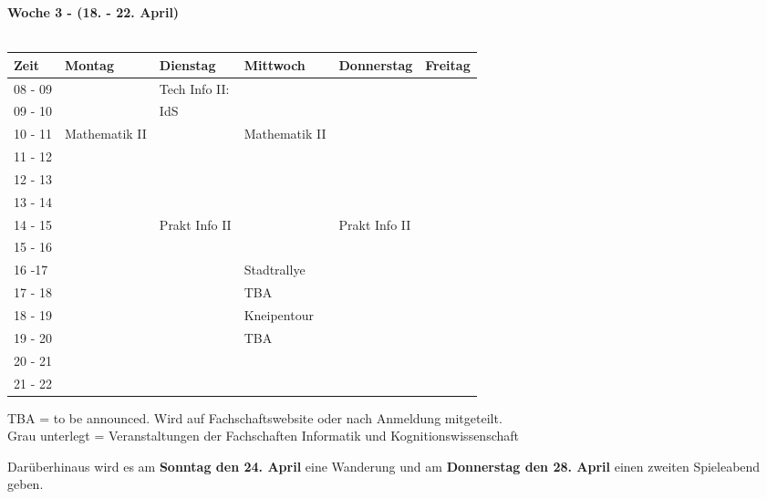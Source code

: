 \textbf{Woche 3 - (18. - 22. April)}\\
\\
\begin{tabular}{|l|p{}|p{}|p{}|p{}|p{}|} \hline
Zeit    & Montag & Dienstag & Mittwoch & Donnerstag & Freitag \\ \hline 
08 - 09 & & \footnotesize{Tech Info II:} & & & \\ \cline{1-1}
09 - 10 & & \footnotesize{IdS} & & & \\ \cline{1-2} \cline{4-4}
10 - 11 & \footnotesize{Mathematik II} & & \footnotesize{Mathematik II} & & \\ \cline{1-1} \cline{3-3}
11 - 12 & & & & & \\ \cline{1-2} \cline{4-4}
12 - 13 & & & & & \\ \cline{1-1}
13 - 14 & & & & & \\ \cline{1-1} \cline{3-3} \cline{5-5}
14 - 15 & & \footnotesize{Prakt Info II} & & \footnotesize{Prakt Info II} & \\ \cline{1-1}
15 - 16 & & & & & \\ \cline{1-1} \cline{3-5}
16 -17  & & & \cellcolor{lightlightgray} \footnotesize{Stadtrallye} & & \\ \cline{1-1}
17 - 18 & & & \cellcolor{lightlightgray} \scriptsize{TBA} & & \\ \cline{1-1} \cline{4-4}
18 - 19 & & & \cellcolor{lightlightgray} \footnotesize{Kneipentour} & & \\ \cline{1-1}
19 - 20 & & & \cellcolor{lightlightgray} \scriptsize{TBA} & & \\ \cline{1-1}
20 - 21 & & & \cellcolor{lightlightgray} & & \\ \cline{1-1}
21 - 22 & & & \cellcolor{lightlightgray} & & \\ \hline
\end{tabular}

{\scriptsize TBA = to be announced. Wird auf Fachschaftswebsite oder nach Anmeldung mitgeteilt.} \\
{\scriptsize Grau unterlegt = Veranstaltungen der Fachschaften Informatik und Kognitionswissenschaft }

\normalsize
Darüberhinaus wird es am \textbf{Sonntag den 24. April} eine Wanderung und am 
\textbf{Donnerstag den 28. April} einen zweiten Spieleabend geben.

\newpage
\normalsize


